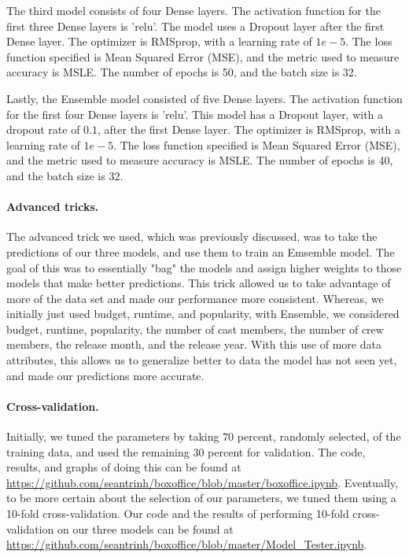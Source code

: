 \documentclass[11pt]{article}
\numberwithin{equation}{section}
\begin{document}
The third model consists of four Dense layers. The activation function for the first three Dense layers is 'relu'. The model uses a Dropout layer after the first Dense layer. The optimizer is RMSprop, with a learning rate of $1e-5$. The loss function specified is Mean Squared Error (MSE), and the metric used to measure accuracy is MSLE. The number of epochs is 50, and the batch size is 32. 

Lastly, the Ensemble model consisted of five Dense layers. The activation function for the first four Dense layers is 'relu'. This model has a Dropout layer, with a dropout rate of $0.1$, after the first Dense layer. The optimizer is RMSprop, with a learning rate of $1e-5$. The loss function specified is Mean Squared Error (MSE), and the metric used to measure accuracy is MSLE. The number of epochs is 40, and the batch size is 32. 

\paragraph{Advanced tricks.}
The advanced trick we used, which was previously discussed, was to take the predictions of our three models, and use them to train an Emsemble model. The goal of this was to essentially "bag" the models and assign higher weights to those models that make better predictions. This trick allowed us to take advantage of more of the data set and made our performance more consistent. Whereas, we initially just used budget, runtime, and popularity, with Ensemble, we considered budget, runtime, popularity, the number of cast members, the number of crew members, the release month, and the release year. With this use of more data attributes, this allows us to generalize better to data the model has not seen yet, and made our predictions more accurate. 

\paragraph{Cross-validation.}
Initially, we tuned the parameters by taking $70$ percent, randomly selected, of the training data, and used the remaining $30$ percent for validation. The code, results, and graphs of doing this can be found at \url{ https://github.com/seantrinh/boxoffice/blob/master/boxoffice.ipynb}. Eventually, to be more certain about the selection of our parameters, we tuned them using a 10-fold cross-validation. Our code and the results of performing 10-fold cross-validation on our three models can be found at \url{https://github.com/seantrinh/boxoffice/blob/master/Model_Tester.ipynb}. 
\end{document}

